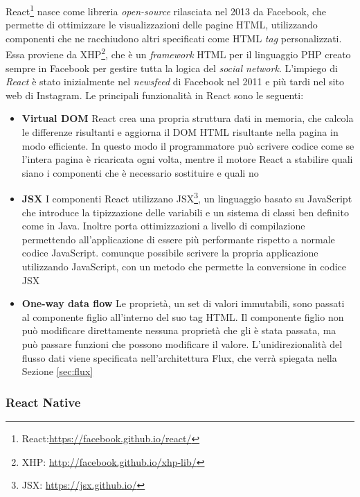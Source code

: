 React\footnote{React:\url{https://facebook.github.io/react/}} nasce come libreria \emph{open-source} rilasciata nel 2013 da Facebook, che permette di ottimizzare le visualizzazioni delle pagine HTML, utilizzando componenti che ne racchiudono altri specificati come HTML \emph{tag} personalizzati.
Essa proviene da XHP\footnote{XHP: \url{http://facebook.github.io/xhp-lib/}}, che è un \emph{framework} HTML per il linguaggio PHP creato sempre in Facebook per gestire tutta la logica del \emph{social network}. L'impiego di \emph{React} è stato inizialmente nel \emph{newsfeed} di Facebook nel 2011 e più tardi nel sito web di Instagram.
Le principali funzionalità in React sono le seguenti:

\begin{itemize}
	\item \textbf{Virtual DOM}
	React crea una propria struttura dati in memoria, che calcola le differenze risultanti e aggiorna il DOM HTML risultante nella pagina in modo efficiente. In questo modo il programmatore può scrivere codice come se l'intera pagina è ricaricata ogni volta, mentre il motore React a stabilire quali siano i componenti che è necessario sostituire e quali no
	\item \textbf{JSX}
	I componenti React utilizzano JSX\footnote{JSX: \url{https://jsx.github.io/}}, un linguaggio basato su JavaScript che introduce la tipizzazione delle variabili e un sistema di classi ben definito come in Java. Inoltre porta ottimizzazioni a livello di compilazione permettendo all'applicazione di essere più performante rispetto a normale codice JavaScript. \upe comunque possibile scrivere la propria applicazione utilizzando JavaScript, con un metodo che permette la conversione in codice JSX
	\item \textbf{One-way data flow}
	Le proprietà, un set di valori immutabili, sono passati al componente figlio all'interno del suo tag HTML. Il componente figlio non può modificare direttamente nessuna proprietà che gli è stata passata, ma può passare funzioni che possono modificare il valore. 
	L'unidirezionalità del flusso dati viene specificata nell'architettura Flux, che verrà spiegata nella Sezione \ref{sec:flux}
\end{itemize}

\subsubsection{React Native}\label{sec:react-native}

